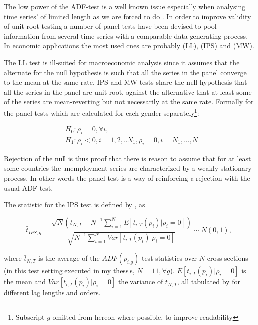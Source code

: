 \documentclass[12pt,a4paper,english]{article}
\begin{document}
The low power of the ADF-test is a well known issue especially when analysing time series' of limited length as we are forced to do \citep{harris1992, hoang2006}. In order to improve validity of unit root testing a number of panel tests have been devised to pool information from several time series with a comparable data generating process. In economic applications the most used ones are probably \cite{levin2002}(LL), \cite{im2003}(IPS) and \cite{maddala1999}(MW).

The LL test is ill-suited for macroeconomic analysis since it assumes that the alternate for the null hypothesis is such that all the series in the panel converge to the mean at the same rate. IPS and MW tests share the null hypothesis that all the series in the panel are unit root, against the alternative that at least some of the series are mean-reverting but not necessarily at the same rate. Formally for the panel tests which are calculated for each gender separately\footnote{Subscript $g$ omitted from hereon where possible, to improve readability}:

\begin{equation}
\begin{split}
&H_0: \rho_{i} = 0, \forall i,\\
&H_1: \rho_{i} < 0, i = 1,2,..N_1, \rho_{i} = 0, i = N_1,...,N
\end{split}
\end{equation}

Rejection of the null is thus proof that there is reason to assume that for at least some countries the unemployment series are characterized by a weakly stationary process. In other words the panel test is a way of reinforcing a rejection with the usual ADF test.

The statistic for the IPS test is defined by \cite{im2003}, as

\begin{equation}
\hat{t}_{IPS,g} = \dfrac{ \sqrt{N}(\bar{t}_{N,T}-N^{-1} \sum_{i=1}^{N} E[t_{i,T}(p_i)|\rho_i=0])  }{\sqrt{ N^{-1} \sum_{i=1}^{N}Var[t_{i,T}(p_i)|\rho_i=0]   }} \sim N(0,1) ,
\end{equation}

where $\bar{t}_{N,T}$ is the average of the $ADF(p_{i,g})$ test statistics over $N$ cross-sections (in this test setting executed in my thessis, $N=11, \forall g$). $E[t_{i,T}(p_i)|\rho_i=0]$ is the mean and $Var[t_{i,T}(p_i)|\rho_i=0]$ the variance of $\bar{t}_{N,T}$, all tabulated by \cite{im2003} for different lag lengths and orders.
\end{document}
